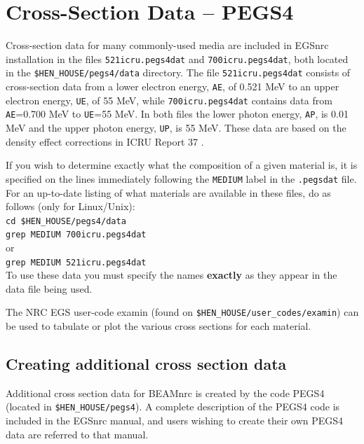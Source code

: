 \documentclass[12pt,twoside]{article}
\begin{document}
\clearpage

\renewcommand{\rightmark}{Cross-section data-PEGS4}
\section{Cross-Section Data -- PEGS4}
\label{CSDP}

Cross-section data for many commonly-used media are included in EGSnrc installation
in the files {\tt 521icru.pegs4dat} and {\tt 700icru.pegs4dat}, both
located in the {\tt \$HEN\_HOUSE/pegs4/data} directory.
The file {\tt 521icru.pegs4dat} consists of cross-section data
from a lower electron energy, {\tt AE}, of 0.521 MeV to an upper
electron energy, {\tt UE}, of 55 MeV, while {\tt 700icru.pegs4dat}
contains data from {\tt AE}=0.700 MeV to {\tt UE}=55 MeV.  In both
files the lower photon energy, {\tt AP}, is 0.01 MeV and
the upper photon energy, {\tt UP}, is 55 MeV.   These data are based on the
density effect corrections in ICRU Report 37 \cite{ICRU37}.

If you wish to determine exactly what the composition of a given
material is, it is specified on the lines immediately following the
\verb+MEDIUM+ label in the {\tt .pegsdat} file.  For an up-to-date listing of
what materials are available in these files, do as follows
(only for Linux/Unix):\\
\verb+cd $HEN_HOUSE/pegs4/data+\\
\verb+grep MEDIUM 700icru.pegs4dat+
\\or\\
\verb+grep MEDIUM 521icru.pegs4dat+\\
To use these data you must specify the names {\bf exactly} as they
appear in the data file being used.

The NRC EGS user-code examin (found on {\tt \$HEN\_HOUSE/user\_codes/examin}) can
be used to tabulate or plot the various cross sections for each
material.

\subsection{Creating additional cross section data}

Additional cross section data for BEAMnrc is created by the code PEGS4
(located in {\tt \$HEN\_HOUSE/pegs4}).
A complete description of the PEGS4 code is included in the EGSnrc
manual\cite{KR03}, and users wishing to create their own PEGS4 data
are referred to that manual.
\end{document}
